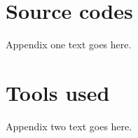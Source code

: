 \documentclass[journal,onecolumn]{IEEEtran}
\begin{document}


%


\appendices

\section{Source codes}
\label{sc}
Appendix one text goes here.

\section{Tools used}
Appendix two text goes here.


\ifCLASSOPTIONcaptionsoff
  \newpage
\fi
\end{document}
